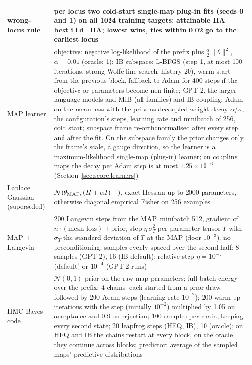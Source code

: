\documentclass[11pt,a4paper]{article}
\begin{document}
\begin{table}[htbp]
\begin{tabular}{p{}p{}}
wrong-locus rule & per locus two cold-start single-map plug-in fits (seeds 0 and 1) on all 1024 training targets; attainable IIA = best i.i.d.\ IIA; lowest wins, ties within 0.02 go to the earliest locus\\
\midrule
MAP learner & objective: negative log-likelihood of the prefix plus $\tfrac\alpha2\|\theta\|^2$, $\alpha=0.01$ (oracle: 1); IB subspace: L-BFGS (step 1, at most 100 iterations, strong-Wolfe line search, history 20), warm start from the previous block, fallback to Adam for 400 steps if the objective or parameters become non-finite; GPT-2, the larger language models and MIB (all families) and IB coupling: Adam on the mean loss with the prior as decoupled weight decay $\alpha/n$, the configuration's steps, learning rate and minibatch of 256, cold start; subspace frame re-orthonormalised after every step and after the fit. On the subspace family the prior changes only the frame's scale, a gauge direction, so the learner is a maximum-likelihood single-map (plug-in) learner; on coupling maps the decay per Adam step is at most $1.25\times10^{-6}$ (Section~\ref{sec:score:learners})\\
Laplace Gaussian (superseded) & $\mathcal N(\theta_{\rm MAP},(H+\alpha I)^{-1})$, exact Hessian up to 2000 parameters, otherwise diagonal empirical Fisher on 256 examples\\
MAP + Langevin & 200 Langevin steps from the MAP, minibatch 512, gradient of $n\cdot(\text{mean loss})+\text{prior}$, step $\eta\,\sigma_T^2$ per parameter tensor $T$ with $\sigma_T$ the standard deviation of $T$ at the MAP (floor $10^{-3}$), no preconditioning; samples evenly spaced over the second half; 8 samples (GPT-2), 16 (IB default); relative step $\eta=10^{-5}$ (default) or $10^{-4}$ (GPT-2 runs)\\
HMC Bayes code & $\mathcal N(0,1)$ prior on the raw map parameters; full-batch energy over the prefix; 4 chains, each started from a prior draw followed by 200 Adam steps (learning rate $10^{-2}$); 200 warm-up iterations with the step (initially $10^{-2}$) multiplied by 1.05 on acceptance and 0.9 on rejection; 100 samples per chain, keeping every second state; 20 leapfrog steps (HEQ, IB), 10 (oracle); on HEQ and IB the chains restart at every block, on the oracle they continue across blocks; predictor: average of the sampled maps' predictive distributions\\
\bottomrule
\end{tabular}
\end{table}
\end{document}
